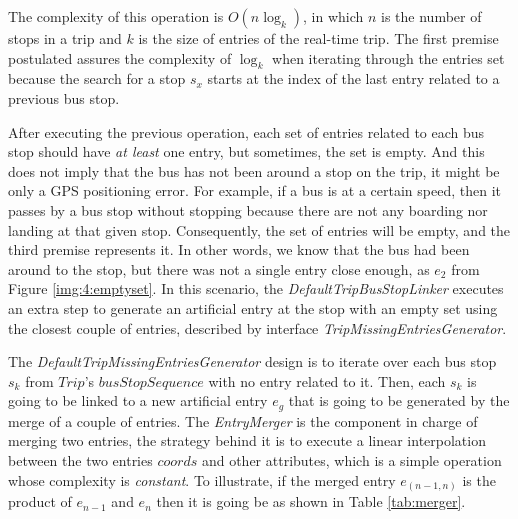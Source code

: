 The complexity of this operation is $O(n \log_k)$, in which
$n$ is the number of stops in a trip and $k$ is the size of entries of
the real-time trip. The first premise postulated assures the complexity of $\log_k$ when 
iterating through the entries set because the search for a stop $s_x$ starts at 
the index of the last entry related to a previous bus stop.


After executing the previous operation, each set of entries 
related to each bus stop should have {\em at least} one entry, 
but sometimes, the set is empty. 
And this does not imply that the bus has not been around a stop on the trip, 
it might be only a GPS positioning error. For example, if a bus is at a
certain speed, then it passes by a bus stop without stopping because there
are not any boarding nor landing at that given stop. Consequently, the
set of entries will be empty, and the third premise represents it. 
In other words, we know 
that the bus had been around to the stop, but there was not a single entry
close enough, as $e_2$ from Figure \ref{img:4:emptyset}. 
In this scenario, the \textit{DefaultTripBusStopLinker} executes an extra step
to generate an artificial entry at the stop with an empty set using the 
closest couple of entries, described by interface \textit{TripMissingEntriesGenerator}.

The \textit{DefaultTripMissingEntriesGenerator} design is to iterate over each 
bus stop $s_k$ from $Trip$'s $busStopSequence$ with no entry related to it. 
Then, each $s_k$
is going to be linked to a new artificial entry $e_g$ that is going to be
generated by the merge of a couple of entries. The \textit{EntryMerger} is the component
in charge of merging two entries, the strategy behind it is to execute a linear interpolation
between the two entries $coords$ and other attributes, which is a simple operation
whose complexity is \textit{constant}. To illustrate, if the merged entry $e_{(n-1, n)}$
is the product of $e_{n-1}$ and $e_n$ then it is going be as shown in Table \ref{tab:merger}.

